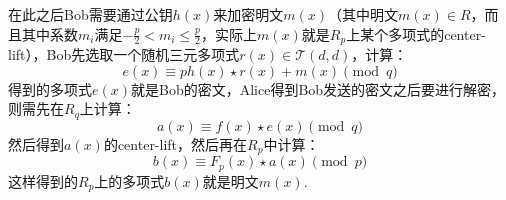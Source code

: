\documentclass{book}
\numberwithin{equation}{subsubsection}
\begin{document}
在此之后Bob需要通过公钥$h(x)$来加密明文$m(x)$（其中明文$m(x)\in R$，而且其中系数$m_i$满足$-\frac{p}{2}<m_i\le \frac{p}{2}$，实际上$m(x)$就是$R_p$上某个多项式的center-lift），Bob先选取一个随机三元多项式$r(x)\in\mathcal{T}(d,d)$，计算：
\begin{equation}
    e(x)\equiv ph(x)\star r(x)+m(x)\pmod{q}
    \nonumber
\end{equation}
得到的多项式$e(x)$就是Bob的密文，Alice得到Bob发送的密文之后要进行解密，则需先在$R_q$上计算：
\begin{equation}
    a(x)\equiv f(x)\star e(x)\pmod{q}
    \nonumber
\end{equation}
然后得到$a(x)$的center-lift，然后再在$R_p$中计算：
\begin{equation}
    b(x)\equiv F_p(x)\star a(x)\pmod{p}
    \nonumber
\end{equation}
这样得到的$R_p$上的多项式$b(x)$就是明文$m(x)$.
\end{document}

